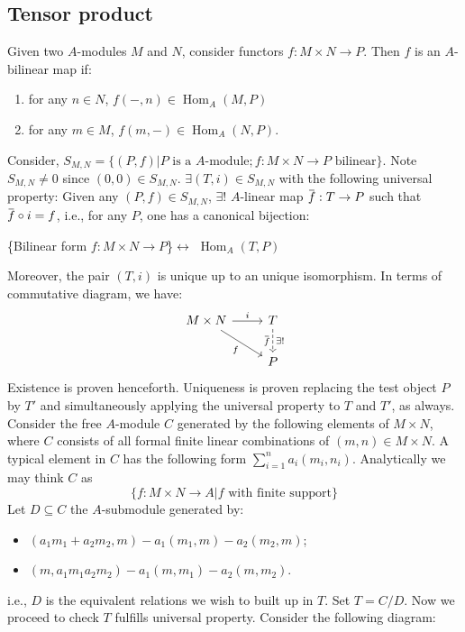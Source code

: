 \documentclass[12pt]{article}
\theoremstyle{definition}
\theoremstyle{plain}
\DeclareMathOperator{\Hom}{Hom}
\newcommand{\overbar}[1]{\mkern 1.5mu\overline{\mkern-1.5mu#1\mkern-1.5mu}\mkern 1.5mu}
\renewcommand{\bar}{\overbar}
\begin{document}
\subsection{Tensor product}
Given two $A$-modules $M$ and $N$, consider functors $f:M\times N\to P$. Then $f$ is an $A$-bilinear map if:
\begin{enumerate}
  \item  for any $n\in N$, $f(-, n)\in \Hom_A(M, P)$
  \item for any $m\in M$, $f(m, -)\in \Hom_A(N, P)$.
\end{enumerate}
Consider, $S_{M, N}=\{(P, f)| P \text{ is a }A\text{-module}; f:M\times N\to P \text{ bilinear}\}$. Note $S_{M,N}\neq 0$ since $(0, 0)\in S_{M, N}$.
 $\exists (T, i)\in S_{M, N}$ with the following universal property: Given any $(P, f)\in S_{M, N}$, $\exists !$ $A$-linear map $\bar{f}:T\to P$ such that $\bar{f}\circ i=f$, i.e., for any $P$, one has a canonical bijection:
\begin{center}
  \{Bilinear form $f:M\times N\to P$\}$\leftrightarrow$ $\Hom_A(T, P)$
\end{center}
Moreover, the pair $(T, i)$ is unique up to an unique isomorphism. In terms of commutative diagram, we have:
\begin{equation}
  \begin{tikzcd}
    M\times N \ar{r}{i} \ar{rd}[swap]{f} & T\ar[dashed]{d}{\exists !}[swap]{\bar{f}}\\
    &P
  \end{tikzcd}
\end{equation}
\proof Existence is proven henceforth. Uniqueness is proven replacing the test object $P$ by $T'$ and simultaneously applying the universal property to $T$ and $T'$, as always.\\Consider the free $A$-module $C$ generated by the following elements of $M\times N$, where $C$ consists of all formal finite linear combinations of $(m, n)\in M\times N$. A typical element in $C$ has the following form $\sum_{i=1}^n a_i(m_i, n_i)$. Analytically we may think $C$ as $$\{f: M\times N\to A|f \text{ with finite support}\}$$
Let $D\subseteq C$ the $A$-submodule generated by:
\begin{itemize}
  \item $(a_1m_1+a_2m_2, m)-a_1(m_1, m)-a_2(m_2, m)$;
  \item $(m, a_1m_1a_2m_2)-a_1(m, m_1)-a_2(m, m_2)$.
\end{itemize}
i.e., $D$ is the equivalent relations we wish to built up in $T$. Set $T=C/D$. Now we proceed to check $T$ fulfills universal property. Consider the following diagram:
\end{document}
